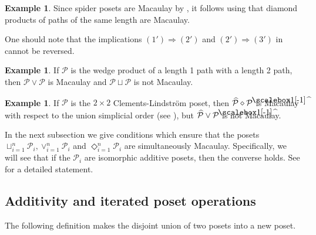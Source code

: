 \documentclass[11pt, reqno]{amsart}
\makeatletter
\renewcommand{\P}{{\mathcal P}}
\newcommand{\di}{\diamond}
\newcommand{\uwidehat}[1]{%
	\mathpalette\douwidehat{#1}%
}
\newcommand{\douwidehat}[2]{%
	\sbox0{$\m@th#1\widehat{\hphantom{#2}}$}%
	\sbox2{$\m@th#1x$}
	\sbox4{$\m@th#1#2$}
	\dimen0=\ht0
	\advance\dimen0 -.8\ht2
	\dimen2=\dp4
	\rlap{%
		\raisebox{\dimexpr\dimen0-\dimen2}{%
			\scalebox{1}[-1]{\box0}%
		}%
	}%
	{#2}%
}
\theoremstyle{plain} %
\theoremstyle{definition}
\newtheorem{ex}[thm]{Example}
\theoremstyle{remark}
\numberwithin{equation}{section}  %
\makeatother
\begin{document}
\begin{ex}\label{prod of paths}
Since  spider posets are Macaulay by \cite{BE}, it follows using  that diamond products of paths of the same length are Macaulay.
\end{ex}



One should note that the implications $(1')\Rightarrow (2')$ and $(2')\Rightarrow (3')$ in  cannot be reversed.

\begin{ex}
    If $\P$ is the wedge product of a length 1 path with a length 2 path, then $\P\lor\P$ is Macaulay and $\P\sqcup\P$ is not Macaulay. \end{ex}

\begin{ex}\label{ex: diamond not wedge}
    If $\P$ is the $2\times 2$ Clements-Lindstr\"om poset, then $\widehat\P\di\uwidehat\P$ is Macaulay with respect to the union simplicial order (see ), but $\widehat\P\lor\uwidehat\P$ is not Macaulay.
\end{ex}
    


In the next subsection we give conditions which ensure that the posets $\sqcup_{i=1}^n \P_i, \vee_{i=1}^n \P_i$ and $\Diamond_{i=1}^n\P_i$ are simultaneously Macaulay. Specifically,  we will see  that if the $\P_i$ are isomorphic additive posets, %
then the converse holds. See  for a detailed statement.




\subsection{Additivity and iterated poset operations}


       The following definition makes the disjoint union of two posets into a new poset.
        
\end{document}
